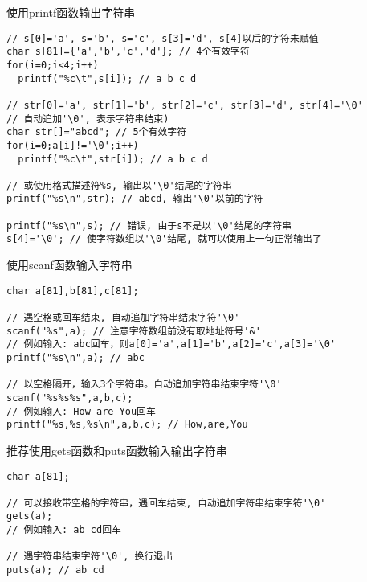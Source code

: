 \begin{frame}{使用printf函数输出字符串}
\begin{lstlisting}
// s[0]='a', s='b', s='c', s[3]='d', s[4]以后的字符未赋值
char s[81]={'a','b','c','d'}; // 4个有效字符
for(i=0;i<4;i++)
  printf("%c\t",s[i]); // a b c d

// str[0]='a', str[1]='b', str[2]='c', str[3]='d', str[4]='\0'
// 自动追加'\0', 表示字符串结束)
char str[]="abcd"; // 5个有效字符
for(i=0;a[i]!='\0';i++)
  printf("%c\t",str[i]); // a b c d

// 或使用格式描述符%s, 输出以'\0'结尾的字符串
printf("%s\n",str); // abcd, 输出'\0'以前的字符

printf("%s\n",s); // 错误, 由于s不是以'\0'结尾的字符串
s[4]='\0'; // 使字符数组以'\0'结尾, 就可以使用上一句正常输出了
\end{lstlisting}
\end{frame}

\begin{frame}{使用scanf函数输入字符串}
\begin{lstlisting}
char a[81],b[81],c[81];

// 遇空格或回车结束, 自动追加字符串结束字符'\0'
scanf("%s",a); // 注意字符数组前没有取地址符号'&'
// 例如输入: abc回车，则a[0]='a',a[1]='b',a[2]='c',a[3]='\0'
printf("%s\n",a); // abc

// 以空格隔开，输入3个字符串。自动追加字符串结束字符'\0'
scanf("%s%s%s",a,b,c); 
// 例如输入: How are You回车
printf("%s,%s,%s\n",a,b,c); // How,are,You
\end{lstlisting}
\end{frame}

\begin{frame}{推荐使用gets函数和puts函数输入输出字符串}
\begin{lstlisting}
char a[81];

// 可以接收带空格的字符串，遇回车结束, 自动追加字符串结束字符'\0'
gets(a);
// 例如输入: ab cd回车

// 遇字符串结束字符'\0', 换行退出
puts(a); // ab cd
\end{lstlisting}
\end{frame}




